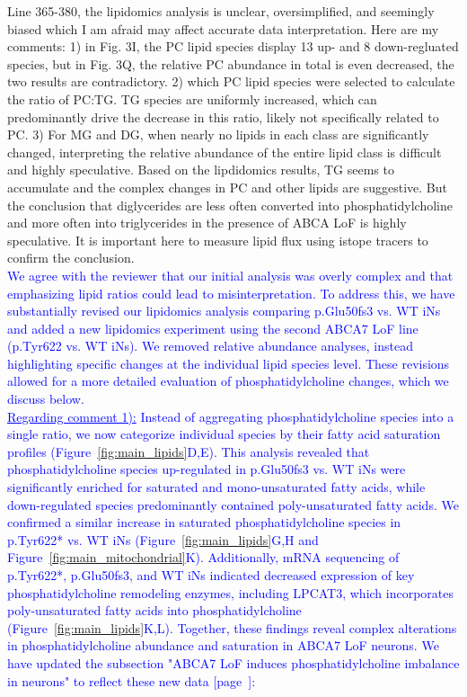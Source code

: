 Line 365-380, the lipidomics analysis is unclear, oversimplified, and seemingly biased which I am afraid may affect accurate data interpretation. Here are my comments: 1) in Fig. 3I, the PC lipid species display 13 up- and 8 down-regluated species, but in Fig. 3Q, the relative PC abundance in total is even decreased, the two results are contradictory. 2) which PC lipid species were selected to calculate the ratio of PC:TG. TG species are uniformly increased, which can predominantly drive the decrease in this ratio, likely not specifically related to PC. 3) For MG and DG, when nearly no lipids in each class are significantly changed, interpreting the relative abundance of the entire lipid class is difficult and highly speculative. Based on the lipdidomics results, TG seems to accumulate and the complex changes in PC and other lipids are suggestive. But the conclusion that diglycerides are less often converted into phosphatidylcholine and more often into triglycerides in the presence of ABCA LoF is highly speculative. It is important here to measure lipid flux using istope tracers to confirm the conclusion.\\
\textcolor{blue}{We agree with the reviewer that our initial analysis was overly complex and that emphasizing lipid ratios could lead to misinterpretation. To address this, we have substantially revised our lipidomics analysis comparing p.Glu50fs3 vs. WT iNs and added a new lipidomics experiment using the second ABCA7 LoF line (p.Tyr622 vs. WT iNs). We removed relative abundance analyses, instead highlighting specific changes at the individual lipid species level. These revisions allowed for a more detailed evaluation of phosphatidylcholine changes, which we discuss below.}\\
\textcolor{blue}{\underline{Regarding comment 1):} Instead of aggregating phosphatidylcholine species into a single ratio, we now categorize individual species by their fatty acid saturation profiles (Figure~\ref{fig:main_lipids}D,E). This analysis revealed that phosphatidylcholine species up-regulated in p.Glu50fs3 vs. WT iNs  were significantly enriched for saturated and mono-unsaturated fatty acids, while down-regulated species predominantly contained poly-unsaturated fatty acids. We confirmed a similar increase in saturated phosphatidylcholine species in p.Tyr622* vs. WT iNs  (Figure~\ref{fig:main_lipids}G,H and Figure~\ref{fig:main_mitochondrial}K). Additionally, mRNA sequencing of p.Tyr622*, p.Glu50fs3, and WT iNs indicated decreased expression of key phosphatidylcholine remodeling enzymes, including LPCAT3, which incorporates poly-unsaturated fatty acids into phosphatidylcholine  (Figure~\ref{fig:main_lipids}K,L). Together, these findings reveal complex alterations in phosphatidylcholine abundance and saturation in ABCA7 LoF neurons. We have updated the subsection "ABCA7 LoF induces phosphatidylcholine imbalance in neurons" to reflect these new data [page~\pageref{quoteA-label}]:}
